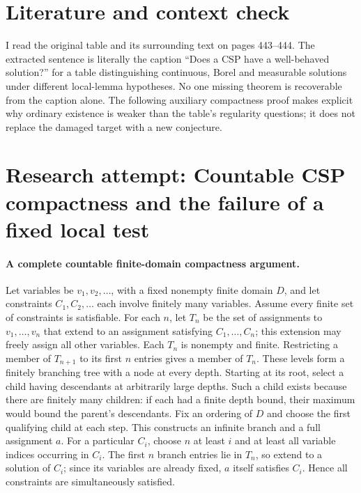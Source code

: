 \documentclass[11pt]{article}
\begin{document}
\section{Literature and context check}

I read the original table and its surrounding text on pages 443--444. The
extracted sentence is literally the caption ``Does a CSP have a well-behaved
solution?'' for a table distinguishing continuous, Borel and measurable
solutions under different local-lemma hypotheses. No one missing theorem is
recoverable from the caption alone. The following auxiliary compactness proof
makes explicit why ordinary existence is weaker than the table's regularity
questions; it does not replace the damaged target with a new conjecture.

\section{Research attempt: Countable CSP compactness and the failure of a fixed local test}

\paragraph{A complete countable finite-domain compactness argument.}
Let variables be $v_1,v_2,\ldots$, with a fixed nonempty finite domain $D$,
and let constraints $C_1,C_2,\ldots$ each involve finitely many variables.
Assume every finite set of constraints is satisfiable. For each $n$, let $T_n$
be the set of assignments to $v_1,\ldots,v_n$ that extend to an assignment
satisfying $C_1,\ldots,C_n$; this extension may freely assign all other
variables. Each $T_n$ is nonempty and finite. Restricting a member of
$T_{n+1}$ to its first $n$ entries gives a member of $T_n$.
These levels form a finitely branching tree with a node at every depth.
Starting at its root, select a child having descendants at arbitrarily large
depths. Such a child exists because there are finitely many children: if each
had a finite depth bound, their maximum would bound the parent's descendants.
Fix an ordering of $D$ and choose the first qualifying child at each step.
This constructs an infinite branch and a full assignment $a$.
For a particular $C_i$, choose $n$ at least $i$ and at least all variable
indices occurring in $C_i$. The first $n$ branch entries lie in $T_n$, so
extend to a solution of $C_i$; since its variables are already fixed, $a$
itself satisfies $C_i$. Hence all constraints are simultaneously satisfied.
\end{document}
